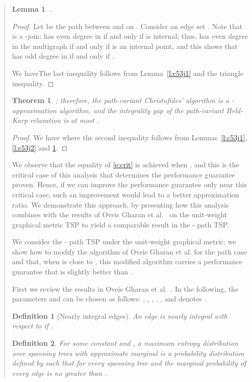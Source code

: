 \documentclass[11pt,letterpaper]{article}
\newtheorem{lemma}{Lemma}
\newtheorem{thm}{Theorem}
\newtheorem{defn}{Definition}
\newcommand{\st}{\mbox{-} }
\begin{document}
\begin{quote}
\begin{lemma}
\label{l:c53j3}
.
\end{lemma}
\begin{proof}
Let  be the path between  and  on . Consider an edge set . Note that  is a -join:  has even degree in  if and only if  is internal; thus,  has even degree in the multigraph  if and only if  is an internal point, and this shows that  has odd degree in  if and only if .

We haveThe last inequality follows from Lemma~\ref{l:c53j1} and the triangle inequality.
\end{proof}

\begin{thm}
; therefore, the path-variant Christofides' algorithm is a -approximation algorithm, and the integrality gap of the path-variant Held-Karp relaxation is at most .
\end{thm}
\begin{proof}
We have
where the second inequality follows from Lemmas~\ref{l:c53j1}, \ref{l:c53j2} and \ref{l:c53j3}.
\end{proof}

We observe that the equality of \eqref{e:crit} is achieved when , and this is the critical case of this analysis that determines the performance guarantee proven. Hence, if we can improve the performance guarantee only near this critical case, such an improvement would lead to a better approximation ratio. We demonstrate this approach, by presenting how this analysis combines with the results of Oveis Gharan et al.~\cite{OSS} on the unit-weight graphical metric TSP to yield a comparable result in the \st path TSP.

We consider the \st path TSP under the unit-weight graphical metric; we show how to modify the algorithm of Oveis Gharan et al. for the path case and that, when  is close to , this modified algorithm carries a performance guarantee that is slightly better than .

First we review the results in Oveis Gharan et al.~\cite{OSS}. In the following, the parameters  and  can be chosen as follows: , , , , , and  denotes .

\begin{defn}[Nearly integral edges]\label{d:niedges}
An edge  is \emph{nearly integral} with respect to  if .
\end{defn}

\begin{defn}\label{d:approxm}
For some constant  and , a \emph{maximum entropy distribution over spanning trees with approximate marginal}  is a probability distribution  defined by  such that  for every spanning tree  and the marginal probability of every edge  is no greater than .
\end{defn}


\end{quote}
\end{document}
